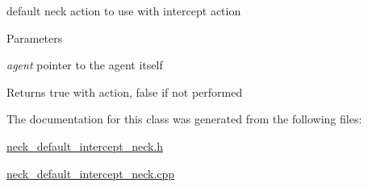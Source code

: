 default neck action to use with intercept action 


\begin{DoxyParams}{Parameters}
\item[{\em agent}]pointer to the agent itself \end{DoxyParams}
\begin{DoxyReturn}{Returns}
true with action, false if not performed 
\end{DoxyReturn}


The documentation for this class was generated from the following files:\begin{DoxyCompactItemize}
\item 
\hyperlink{neck__default__intercept__neck_8h}{neck\_\-default\_\-intercept\_\-neck.h}\item 
\hyperlink{neck__default__intercept__neck_8cpp}{neck\_\-default\_\-intercept\_\-neck.cpp}\end{DoxyCompactItemize}

